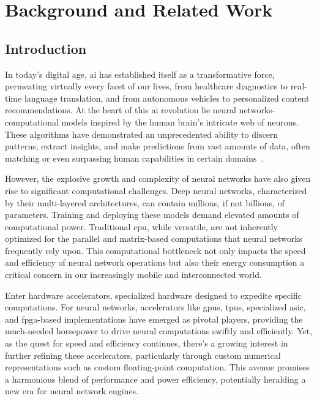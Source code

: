 \chapter{Background and Related Work}\label{chap.background}
\minitoc

\section{Introduction}
In today's digital age, \gls{ai} has established itself as a transformative force, permeating virtually every facet of our lives, from healthcare diagnostics to real-time language translation, and from autonomous vehicles to personalized content recommendations. At the heart of this \gls{ai} revolution lie neural networks-computational models inspired by the human brain's intricate web of neurons. These algorithms have demonstrated an unprecedented ability to discern patterns, extract insights, and make predictions from vast amounts of data, often matching or even surpassing human capabilities in certain domains~\cite{silver2016mastering, gulshan2016development, lake2015human, xiong2016achieving, brown2020language}.

However, the explosive growth and complexity of neural networks have also given rise to significant computational challenges. Deep neural networks, characterized by their multi-layered architectures, can contain millions, if not billions, of parameters. Training and deploying these models demand elevated amounts of computational power. Traditional \gls{cpu}, while versatile, are not inherently optimized for the parallel and matrix-based computations that neural networks frequently rely upon. This computational bottleneck not only impacts the speed and efficiency of neural network operations but also their energy consumption a critical concern in our increasingly mobile and interconnected world.

Enter hardware accelerators, specialized hardware designed to expedite specific computations. For neural networks, accelerators like \glspl{gpu}, \glspl{tpu}, specialized \gls{asic}, and \gls{fpga}-based implementations have emerged as pivotal players, providing the much-needed horsepower to drive neural computations swiftly and efficiently. Yet, as the quest for speed and efficiency continues, there's a growing interest in further refining these accelerators, particularly through custom numerical representations such as custom floating-point computation. This avenue promises a harmonious blend of performance and power efficiency, potentially heralding a new era for neural network engines.

